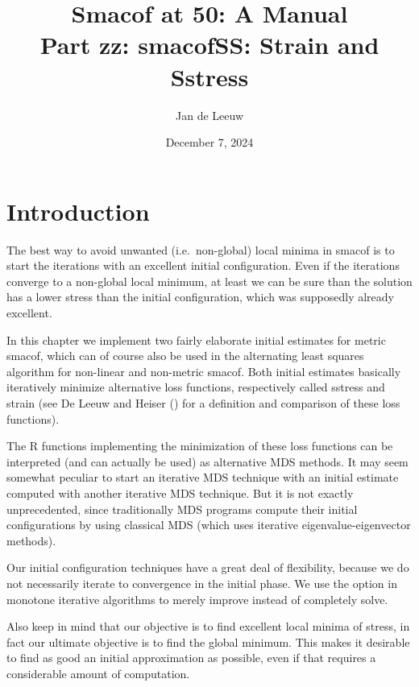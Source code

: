 \documentclass[
  12pt,
  letterpaper,
  DIV=11,
  numbers=noendperiod]{scrartcl}
\title{Smacof at 50: A Manual\\
Part zz: smacofSS: Strain and Sstress}
\author{Jan de Leeuw}
\date{December 7, 2024}
\newcommand{\sectionbreak}{\clearpage}
\renewcommand*\contentsname{Table of contents}
\newcommand\contentsname{Table of contents}
\begin{document}
\maketitle

\renewcommand*\contentsname{Table of contents}
{
\hypersetup{linkcolor=}
\setcounter{tocdepth}{3}
\tableofcontents
}

\sectionbreak

\section{Introduction}\label{introduction}

The best way to avoid unwanted (i.e.~non-global) local minima in smacof
is to start the iterations with an excellent initial configuration. Even
if the iterations converge to a non-global local minimum, at least we
can be sure than the solution has a lower stress than the initial
configuration, which was supposedly already excellent.

In this chapter we implement two fairly elaborate initial estimates for
metric smacof, which can of course also be used in the alternating least
squares algorithm for non-linear and non-metric smacof. Both initial
estimates basically iteratively minimize alternative loss functions,
respectively called sstress and strain (see De Leeuw and Heiser
() for a definition and
comparison of these loss functions).

The R functions implementing the minimization of these loss functions
can be interpreted (and can actually be used) as alternative MDS
methods. It may seem somewhat peculiar to start an iterative MDS
technique with an initial estimate computed with another iterative MDS
technique. But it is not exactly unprecedented, since traditionally MDS
programs compute their initial configurations by using classical MDS
(which uses iterative eigenvalue-eigenvector methods).

Our initial configuration techniques have a great deal of flexibility,
because we do not necessarily iterate to convergence in the initial
phase. We use the option in monotone iterative algorithms to merely
improve instead of completely solve.

Also keep in mind that our objective is to find excellent local minima
of stress, in fact our ultimate objective is to find the global minimum.
This makes it desirable to find as good an initial approximation as
possible, even if that requires a considerable amount of computation.
\end{document}
